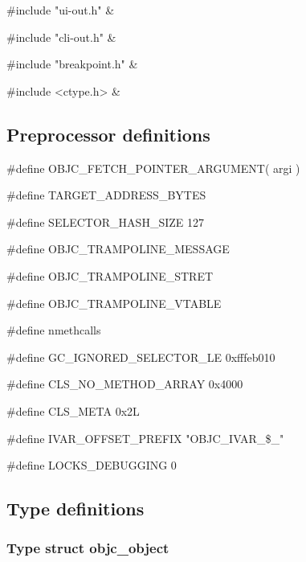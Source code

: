 \medskip
\begin{cxreftabi}
{\stt \#include "ui-out.h"} &\\
\end{cxreftabi}

\medskip
\begin{cxreftabi}
{\stt \#include "cli-out.h"} &\\
\end{cxreftabi}

\medskip
\begin{cxreftabi}
{\stt \#include "breakpoint.h"} &\\
\end{cxreftabi}

\medskip
\begin{cxreftabi}
{\stt \#include <ctype.h>} &\\
\end{cxreftabi}


\subsection*{Preprocessor definitions}

{\stt \#define OBJC\_FETCH\_POINTER\_ARGUMENT( argi )}

\medskip
{\stt \#define TARGET\_ADDRESS\_BYTES}

\medskip
{\stt \#define SELECTOR\_HASH\_SIZE 127}

\medskip
{\stt \#define OBJC\_TRAMPOLINE\_MESSAGE}

\medskip
{\stt \#define OBJC\_TRAMPOLINE\_STRET}

\medskip
{\stt \#define OBJC\_TRAMPOLINE\_VTABLE}

\medskip
{\stt \#define nmethcalls}

\medskip
{\stt \#define GC\_IGNORED\_SELECTOR\_LE 0xfffeb010}

\medskip
{\stt \#define CLS\_NO\_METHOD\_ARRAY 0x4000}

\medskip
{\stt \#define CLS\_META 0x2L}

\medskip
{\stt \#define IVAR\_OFFSET\_PREFIX "OBJC\_IVAR\_\$\_"}

\medskip
{\stt \#define LOCKS\_DEBUGGING 0}


\subsection{Type definitions}


\subsubsection{Type struct objc\_object}
\label{type_struct_objc_object_objc-lang.c}


